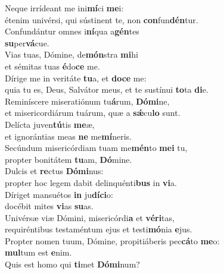 \evenverse Neque irrídeant me ini\textbf{mí}ci \textbf{me}i:~\*\\
\evenverse étenim univérsi, qui sústinent te, non \textbf{con}fun\textbf{dén}tur.\\
\oddverse Confundántur omnes i\textbf{ní}qua a\textbf{gén}tes~\*\\
\oddverse \textbf{su}per\textbf{vá}cue.\\
\evenverse Vias tuas, Dómine, de\textbf{món}stra \textbf{mi}hi~\*\\
\evenverse et sémitas tuas \textbf{é}do\textbf{ce} me.\\
\oddverse Dírige me in veritáte \textbf{tu}a, et \textbf{do}\textbf{ce} me:~\*\\
\oddverse quia tu es, Deus, Salvátor meus, et te sustínui \textbf{to}ta \textbf{di}e.\\
\evenverse Reminíscere miseratiónum tu\textbf{á}rum, \textbf{Dó}\textbf{mi}ne,~\*\\
\evenverse et misericordiárum tuárum, quæ a \textbf{sǽ}cu\textbf{lo} sunt.\\
\oddverse Delícta juven\textbf{tú}tis \textbf{me}æ,~\*\\
\oddverse et ignorántias meas \textbf{ne} me\textbf{mí}neris.\\
\evenverse Secúndum misericórdiam tuam me\textbf{mén}to \textbf{me}\textbf{i} tu,~\*\\
\evenverse propter bonitátem \textbf{tu}am, \textbf{Dó}mine.\\
\oddverse Dulcis et \textbf{re}ctus \textbf{Dó}\textbf{mi}nus:~\*\\
\oddverse propter hoc legem dabit delinquénti\textbf{bus} in \textbf{vi}a.\\
\evenverse Díriget mansuétos \textbf{in} ju\textbf{dí}\textbf{ci}o:~\*\\
\evenverse docébit mites \textbf{vi}as \textbf{su}as.\\
\oddverse Univérsæ viæ Dómini, misericórdi\textbf{a} et \textbf{vé}\textbf{ri}tas,~\*\\
\oddverse requiréntibus testaméntum ejus et testi\textbf{mó}nia \textbf{e}jus.\\
\evenverse Propter nomen tuum, Dómine, propitiáberis pec\textbf{cá}to \textbf{me}o:~\*\\
\evenverse \textbf{mul}tum est \textbf{e}nim.\\
\oddverse Quis est homo qui \textbf{ti}met \textbf{Dó}\textbf{mi}num?~\*\\
